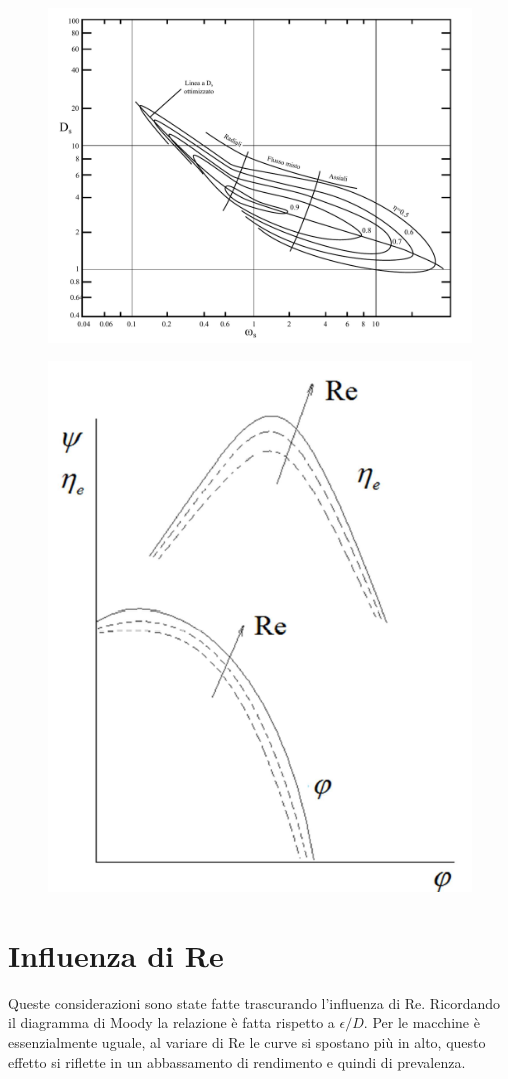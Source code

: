 \begin{figure}
\centering
\begin{minipage}{.5\textwidth}
  \centering
  \includegraphics[width=.9\linewidth]{fig/primo_3.pdf}
  \label{fig:primo_3}
\end{minipage}%
\begin{minipage}{.5\textwidth}
  \centering
  \includegraphics[width=.6\linewidth]{fig/secondo_1.png}
  \label{fig:secondo_1}
\end{minipage}
\end{figure}
\section{Influenza di Re}
Queste considerazioni sono state fatte trascurando l'influenza di Re. Ricordando il diagramma di Moody la relazione è fatta rispetto a $\epsilon/D$. Per le macchine è essenzialmente uguale, al variare di Re le curve si spostano più in alto, questo effetto si riflette in un abbassamento di rendimento e quindi di prevalenza.

